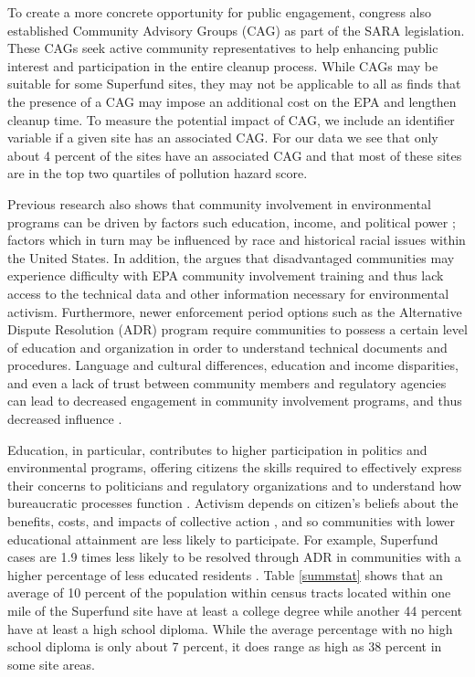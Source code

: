 \documentclass[12pt]{article}
\begin{document}
To create a more concrete opportunity for public engagement, congress also established Community Advisory Groups (CAG) as part of the SARA legislation. These CAGs seek active community representatives to help enhancing public interest and participation in the entire cleanup process. While CAGs may be suitable for some Superfund sites, they may not be applicable to all as \textcite{daley2004policy} finds that the presence of a CAG may impose an additional cost on the EPA and lengthen cleanup time. To measure the potential impact of CAG, we include an identifier variable if a given site has an associated CAG. For our data we see that only about 4 percent of the sites have an associated CAG and that most of these sites are in the top two quartiles of pollution hazard score. 

Previous research also shows that community involvement in environmental programs can be driven by factors such education, income, and political power \parencite{daniels2012public, OEJ2017}; factors which in turn may be influenced by race and historical racial issues within the United States. In addition, the \textcite{united2003not} argues that disadvantaged communities may experience difficulty with EPA community involvement training and thus lack access to the technical data and other information necessary for environmental activism. Furthermore, newer enforcement period options such as the Alternative Dispute Resolution (ADR) program require communities to possess a certain level of education and organization in order to understand technical documents and procedures. Language and cultural differences, education and income disparities, and even a lack of trust between community members and regulatory agencies can lead to decreased engagement in community involvement programs, and thus decreased influence \parencite{EPA2011}.

Education, in particular, contributes to higher participation in politics and environmental programs, offering citizens the skills required to effectively express their concerns to politicians and regulatory organizations \parencite{verba1995voice} and to understand how bureaucratic processes function \parencite{Howell1992, rosenstone1993mobilization}. Activism depends on citizen's beliefs about the benefits, costs, and impacts of collective action \parencite{finkel1989personal}, and so communities with lower educational attainment are less likely to participate. For example, Superfund cases are 1.9 times less likely to be resolved through ADR in communities with a higher percentage of less educated residents \parencite{Collins2008}. Table \ref{summstat} shows that an average of 10 percent of the population within census tracts located within one mile of the Superfund site have at least a college degree while another 44 percent have at least a high school diploma. While the average percentage with no high school diploma is only about 7 percent, it does range as high as 38 percent in some site areas. 
\end{document}
